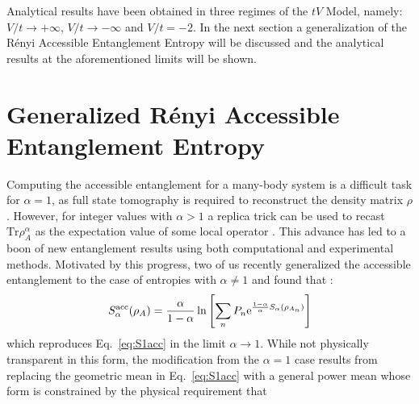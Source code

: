 Analytical results have been obtained in three regimes of the $tV$ Model, namely: $V/t \to + \infty$, $V/t \to - \infty$ and $V/t = -2$. In the next section a generalization of the R\'enyi Accessible Entanglement Entropy will be discussed and the analytical results at the aforementioned limits will be shown.

\section{Generalized R\'enyi Accessible Entanglement Entropy}

Computing the accessible entanglement for a many-body system is a difficult task for $\alpha=1$, as full state tomography is required to reconstruct the density matrix $\rho$. However, for integer values with $\alpha > 1$ a replica trick can be used to recast $\mathrm{Tr} \rho_A^\alpha$ as the expectation value of some local operator \cite{Calabrese:2004hl}. This advance has led to a boon of new entanglement results using both computational \cite{Hastings:2010dc, Humeniuk:2012cq, McMinis:2013dp, Herdman:2014ey, Drut:2015fs} and experimental \cite{Daley:2012bd, Islam:2015cm, Kaufman:2016ep, Pichler:2016ec, Linke:2017tf, Lukin:2018wg} methods.  Motivated by this progress, two of us recently generalized the accessible entanglement to the case of \ren entropies with $\alpha \ne 1$ and found that \cite{Barghathi:2018oe}:
%
\begin{equation}
S_{\alpha}^{{\rm acc}} (\rho_A) = \frac{\alpha}{1-\alpha}\ln\left[ \sum_{n} P_n \mathrm{e}^{\frac{1-\alpha}{\alpha} S_{\alpha}(\rho_{A_n})}\right]
\label{eq:S_alpha_acc}
\end{equation} 
%
which reproduces Eq.~\eqref{eq:S1acc} in the limit $\alpha \to 1$. While not physically transparent in this form, the modification from the $\alpha=1$ case results from replacing the geometric mean in Eq.~\eqref{eq:S1acc} with a general power mean whose form is constrained by the physical requirement that
